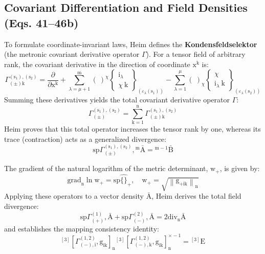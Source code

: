\documentclass[12pt]{article}
\begin{document}
\subsection{Covariant Differentiation and Field Densities (Eqs. 41--46b)}
\label{sec:field_covariant_diff}

To formulate coordinate-invariant laws, Heim defines the \textbf{Kondensfeldselektor} (the metronic covariant derivative operator $\Gamma$). For a tensor field of arbitrary rank, the covariant derivative in the direction of coordinate $\mathrm{x^k}$ is:
\begin{equation}
\Gamma^{(\mathrm{s}_1), (\mathrm{s}_2)}_{(\pm)\mathrm{k}} = \frac{\partial}{\partial \mathrm{x^k}} + \sum_{\lambda=\mu+1}^{\mathrm{m}} (\ )^\chi \left\{ \begin{smallmatrix} \mathrm{i}_\lambda \\ \chi \ \mathrm{k} \end{smallmatrix} \right\}_{(\varepsilon_\lambda(\mathrm{s}_1))} - \sum_{\lambda=1}^{\mu} (\ )_\chi \left\{ \begin{smallmatrix} \chi \\ \mathrm{i}_\lambda \ \mathrm{k} \end{smallmatrix} \right\}_{(\varepsilon_\lambda(\mathrm{s}_2))} \tag{42}
\end{equation}
Summing these derivatives yields the total covariant derivative operator $\Gamma$:
\begin{equation}
\Gamma^{(\mathrm{s}_1), (\mathrm{s}_2)}_{(\pm)} = \sum_{\mathrm{k}=1}^\mathrm{n} \Gamma^{(\mathrm{s}_1), (\mathrm{s}_2)}_{(\pm)\mathrm{k}} \tag{42a}
\end{equation}
Heim proves that this total operator increases the tensor rank by one, whereas its trace (contraction) acts as a generalized divergence:
\begin{equation}
\mathrm{sp} \Gamma^{(\mathrm{s}_1), (\mathrm{s}_2)}_{(\pm)}, {}^\mathrm{m}\bar{\mathrm{A}} = {}^{\mathrm{m}-1}\bar{\mathrm{B}} \tag{43}
\end{equation}

The gradient of the natural logarithm of the metric determinant, $\mathrm{w}_+$, is given by:
\begin{equation}
\mathrm{grad}_\mathrm{n} \ln \mathrm{w}_+ = \mathrm{sp} \widehat{\{\}}_+, \quad \mathrm{w}_+ = \sqrt{\left\| \mathrm{g}_{+\mathrm{ik}} \right\|_\mathrm{n}} \tag{41}
\end{equation}
Applying these operators to a vector density $\bar{\mathrm{A}}$, Heim derives the total field divergence:
\begin{equation}
\mathrm{sp} \Gamma^{(1)}_{(+)}, \bar{\mathrm{A}} + \mathrm{sp} \Gamma^{(2)}_{(-)}, \bar{\mathrm{A}} = 2 \mathrm{div}_\mathrm{n} \bar{\mathrm{A}} \tag{46}
\end{equation}
and establishes the mapping consistency identity:
\begin{equation}
{}^{[3]}\left[ \Gamma^{(1,2)}_{(-),\mathrm{i}}, \mathrm{g}_{\mathrm{ik}} \right]_\mathrm{n} {}^{[3]}\left[ \Gamma^{(1,2)}_{(-),\mathrm{k}}, \mathrm{g}_{\mathrm{ik}} \right]_\mathrm{n}^{\times -1} = {}^{[3]}\mathrm{E} \tag{46b}
\end{equation}
\end{document}
